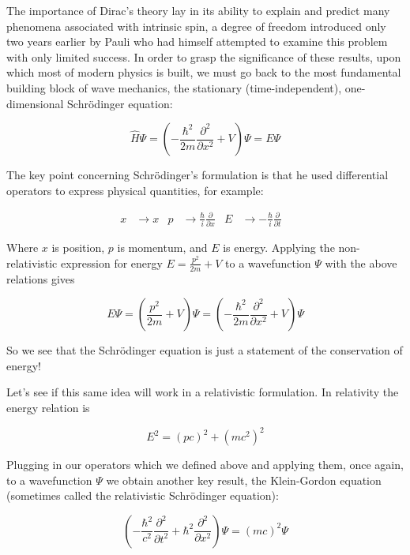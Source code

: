 \documentclass[12pt]{book}
\begin{document}
The importance of Dirac's theory\cite{dirac} lay in its ability to explain and predict many phenomena associated with intrinsic spin, a degree of freedom introduced only two years earlier by Pauli who had himself attempted to examine this problem with only limited success\cite{pauli:spin}. In order to grasp the significance of these results, upon which most of modern physics is built, we must go back to the most fundamental building block of wave mechanics, the stationary (time-independent), one-dimensional Schr\"{o}dinger equation:

\begin{equation}\label{TISE}
\hat{H}\Psi=\left(-\frac{\hbar^{2}}{2m} \frac{\partial^{2}}{\partial x^{2}}+V\right)\Psi=E\Psi
\end{equation}

The key point concerning Schr\"{o}dinger's formulation is that he used differential operators to express physical quantities, for example:

\begin{align}\label{ops}
x& \rightarrow x&
  p& \rightarrow \frac{\hbar}{i} \frac{\partial}{\partial x}&
E& \rightarrow -\frac{\hbar}{i} \frac{\partial}{\partial t}&
\end{align}

Where $x$ is position, $p$ is momentum, and $E$ is energy. Applying the non-relativistic expression for energy $E=\frac{p^{2}}{2m}+V$ to a wavefunction $\Psi$ with the above relations gives

\begin{equation}
 E\Psi=\left(\frac{p^{2}}{2m}+V\right)\Psi=\left(-\frac{\hbar^{2}}{2m} \frac{\partial^{2}}{\partial x^{2}}+V\right)\Psi
\end{equation}

So we see that the Schr\"{o}dinger equation is just a statement of the conservation of energy!

Let's see if this same idea will work in a relativistic formulation. In relativity the energy relation is 

\begin{equation}\label{rel}
E^{2}=(pc)^{2}+(mc^{2})^{2} 
\end{equation}

Plugging in our operators which we defined above and applying them, once again, to a wavefunction $\Psi$ we obtain another key result, the Klein-Gordon equation (sometimes called the relativistic Schr\"{o}dinger equation):

\begin{equation}
\left(-\frac{\hbar^{2}}{c^{2}}\frac{\partial^{2}}{\partial t^{2}}+\hbar^{2}\frac{\partial^{2}}{\partial x^{2}}\right)\Psi=(mc)^{2}\Psi 
\end{equation}
\end{document}

